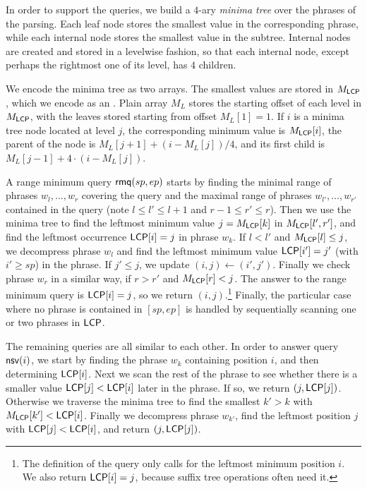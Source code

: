 In order to support the queries, we build a $4$-ary \emph{minima tree} over
the phrases of the \RLZ{} parsing. Each leaf node stores the smallest \LCP{}
value in the corresponding phrase, while each internal node stores the
smallest value in the subtree. Internal nodes are created and stored in a
levelwise fashion, so that each internal node, except perhaps the rightmost
one of its level, has $4$ children.

We encode the minima tree as two arrays. The smallest \LCP{} values are
stored in $M_{\mathsf{LCP}}$, which we encode as an \slarray. Plain array $M_{L}$
stores the starting offset of each level in $M_{\mathsf{LCP}}$, with the leaves
stored starting from offset $M_{L}[1] = 1$. If $i$ is a minima tree node
located at level $j$, the corresponding minimum value is $M_{\mathsf{LCP}}[i]$, the
parent of the node is $M_{L}[j+1] + (i - M_{L}[j]) / 4$, and its first child
is $M_{L}[j-1] + 4 \cdot (i - M_{L}[j])$.

A range minimum query $\mathsf{rmq}(sp,ep)$ starts by finding the minimal range of
phrases $w_{l}, \dotsc, w_{r}$ covering the query and the maximal range of
phrases $w_{l'}, \dotsc, w_{r'}$ contained in the query (note $l \le l' \le
l+1$ and $r-1 \le r' \le r$). Then we use the
minima tree to find the leftmost minimum value $j = M_{\mathsf{LCP}}[k]$ in
$M_{\mathsf{LCP}}[l',r']$, and find the leftmost occurrence $\mathsf{LCP}[i] = j$ in phrase
$w_{k}$. If $l < l'$ and $M_{\mathsf{LCP}}[l] \le j$, we decompress phrase $w_{l}$
and find the leftmost minimum value $\mathsf{LCP}[i'] = j'$ (with $i' \ge sp$) in the
phrase. If $j' \le j$, we update $(i,j) \leftarrow (i',j')$. Finally we check
phrase $w_{r}$ in a similar way, if $r > r'$ and $M_{\mathsf{LCP}}[r] < j$. The answer
to the range minimum query is $\mathsf{LCP}[i] = j$, so we return
$(i,j)$.\footnote{The definition of the query only calls for the leftmost
minimum position $i$. We also return $\mathsf{LCP}[i] = j$, because suffix tree
operations often need it.} Finally, the particular case where no phrase is
contained in $[sp,ep]$ is handled by sequentially scanning one or two phrases
in $\textsf{LCP}$.

The remaining queries are all similar to each other. In order to answer query
$\mathsf{nsv}(i)$, we start by finding the phrase $w_{k}$ containing position $i$,
and then determining $\mathsf{LCP}[i]$. Next we scan the rest of the phrase to see
whether there is a smaller value $\mathsf{LCP}[j] < \mathsf{LCP}[i]$ later in the phrase. If
so, we return $(j,\mathsf{LCP}[j])$. Otherwise we traverse the minima tree to find
the smallest $k' > k$ with $M_{\mathsf{LCP}}[k'] < \mathsf{LCP}[i]$. Finally we decompress
phrase $w_{k'}$, find the leftmost position $j$ with $\mathsf{LCP}[j] < \mathsf{LCP}[i]$,
and return $(j,\mathsf{LCP}[j])$.


